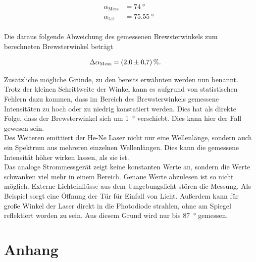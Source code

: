 \begin{align*}
    \alpha_\text{Mess} &= \qty{74}{\degree} \\
    \alpha_\text{Lit}  &= \qty{75.55}{\degree} \\
\end{align*}

\noindent Die daraus folgende Abweichung des gemessenen Brewsterwinkels zum berechneten Brewsterwinkel beträgt 

\begin{align*}
    \Delta \alpha_\text{Mess} &= \qty{2.0\pm0.7}{\percent}.
\end{align*}

\noindent Zusätzliche mögliche Gründe, zu den bereits erwähnten werden nun benannt.\\
\noindent Trotz der kleinen Schrittweite der Winkel kann es aufgrund von statistischen Fehlern dazu kommen, dass im Bereich 
des Brewsterwinkels gemessene Intensitäten zu hoch oder zu niedrig konstatiert werden. Dies hat als direkte Folge, dass der 
Brewsterwinkel sich um \qty{1}{\degree} verschiebt. Dies kann hier der Fall gewesen sein.\\
\noindent Des Weiteren emittiert der He-Ne Laser nicht nur eine Wellenlänge, sondern auch ein Spektrum aus mehreren einzelnen 
Wellenlängen. Dies kann die gemessene Intensität höher wirken lassen, als sie ist.\\
\noindent Das analoge Strommessgerät zeigt keine konstanten Werte an, sondern die Werte schwanken viel mehr in einem Bereich. 
Genaue Werte abzulesen ist so nicht möglich. Externe Lichteinflüsse aus dem Umgebungslicht stören die Messung. Als Beispiel 
sorgt eine Öffnung der Tür für Einfall von Licht. Außerdem kann für große Winkel der Laser direkt in die Photodiode strahlen, 
ohne am Spiegel reflektiert worden zu sein. Aus diesem Grund wird nur bis \qty{87}{\degree} gemessen.




\section{Anhang}

